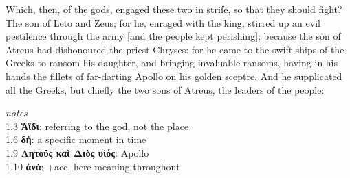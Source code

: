 \documentclass{ransom}
\begin{document}
Which, then, of the gods, engaged these two in strife, so that they
should fight? The son of Leto and Zeus; for he, enraged with the
king, stirred up an evil pestilence through the army [and the people
kept perishing]; because the son of Atreus had dishonoured the priest
Chryses: for he came to the swift ships of the Greeks to ransom his
daughter, and bringing invaluable ransoms, having in his hands the
fillets of far-darting Apollo on his golden sceptre. And he supplicated
all the Greeks, but chiefly the two sons of Atreus, the leaders of the
people:
    \par
    \textit{notes}\\
    1.3 \textbf{Ἄϊδι}: referring to the god, not the place\\1.6 \textbf{δὴ}: a specific moment in time\\1.9 \textbf{Λητοῦς καὶ Διὸς υἱός}: Apollo\\1.10 \textbf{ἀνὰ}: +acc, here meaning throughout
\end{document}
